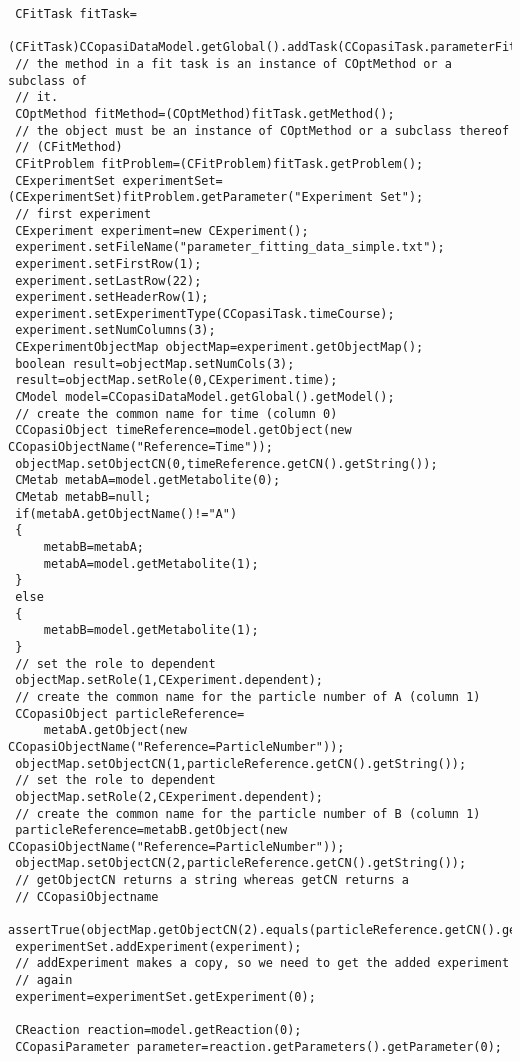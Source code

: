 \documentclass[a4,10pt]{article}
\begin{document}
\begin{lstlisting}
 CFitTask fitTask=
   (CFitTask)CCopasiDataModel.getGlobal().addTask(CCopasiTask.parameterFitting);
 // the method in a fit task is an instance of COptMethod or a subclass of
 // it.
 COptMethod fitMethod=(COptMethod)fitTask.getMethod();
 // the object must be an instance of COptMethod or a subclass thereof
 // (CFitMethod)
 CFitProblem fitProblem=(CFitProblem)fitTask.getProblem();
 CExperimentSet experimentSet=(CExperimentSet)fitProblem.getParameter("Experiment Set");
 // first experiment
 CExperiment experiment=new CExperiment();
 experiment.setFileName("parameter_fitting_data_simple.txt");
 experiment.setFirstRow(1);
 experiment.setLastRow(22);
 experiment.setHeaderRow(1);
 experiment.setExperimentType(CCopasiTask.timeCourse);
 experiment.setNumColumns(3);
 CExperimentObjectMap objectMap=experiment.getObjectMap();
 boolean result=objectMap.setNumCols(3);
 result=objectMap.setRole(0,CExperiment.time);
 CModel model=CCopasiDataModel.getGlobal().getModel();
 // create the common name for time (column 0)
 CCopasiObject timeReference=model.getObject(new CCopasiObjectName("Reference=Time"));
 objectMap.setObjectCN(0,timeReference.getCN().getString());
 CMetab metabA=model.getMetabolite(0);
 CMetab metabB=null;
 if(metabA.getObjectName()!="A")
 {
     metabB=metabA;
     metabA=model.getMetabolite(1);
 }
 else
 {
     metabB=model.getMetabolite(1);
 }
 // set the role to dependent
 objectMap.setRole(1,CExperiment.dependent);
 // create the common name for the particle number of A (column 1)
 CCopasiObject particleReference=
     metabA.getObject(new CCopasiObjectName("Reference=ParticleNumber"));
 objectMap.setObjectCN(1,particleReference.getCN().getString());
 // set the role to dependent
 objectMap.setRole(2,CExperiment.dependent);
 // create the common name for the particle number of B (column 1)
 particleReference=metabB.getObject(new CCopasiObjectName("Reference=ParticleNumber"));
 objectMap.setObjectCN(2,particleReference.getCN().getString());
 // getObjectCN returns a string whereas getCN returns a
 // CCopasiObjectname
 assertTrue(objectMap.getObjectCN(2).equals(particleReference.getCN().getString()));
 experimentSet.addExperiment(experiment);
 // addExperiment makes a copy, so we need to get the added experiment
 // again
 experiment=experimentSet.getExperiment(0);

 CReaction reaction=model.getReaction(0);
 CCopasiParameter parameter=reaction.getParameters().getParameter(0);
 

\end{lstlisting}
\end{document}
